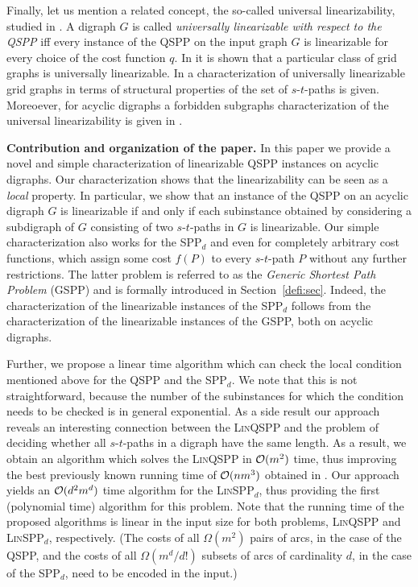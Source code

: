    Finally, let us mention a related  concept, the  so-called universal linearizability,
   studied in \cite{cela2021linearizable,huSo2018}.
A digraph $G$ is called \emph{universally linearizable with respect to the
  QSPP} iff every instance of the QSPP on the input graph $G$ is linearizable for
every choice of the cost function $q$. In \cite{huSo2018} it is shown that a
particular class of grid graphs is universally linearizable. In
\cite{cela2021linearizable} a characterization of universally linearizable grid
graphs in terms of structural properties of the set of $s$-$t$-paths is
given. Moreoever, for acyclic digraphs a forbidden subgraphs characterization of
the universal linearizability is given in \cite{cela2021linearizable}.  
\medskip

\textbf{Contribution and organization of the paper.}
In this paper we provide a novel and simple characterization of linearizable QSPP instances on acyclic 
digraphs.
Our characterization shows that the linearizability can be seen as a  \emph{local} property.  In particular, we show  that an instance of the QSPP on an acyclic 
digraph $G$  is linearizable if and only if each subinstance obtained by considering a subdigraph of $G$ consisting of two $s$-$t$-paths in $G$   is linearizable. Our simple characterization also works for the SPP$_d$  and even for completely arbitrary cost  functions, which  assign some cost $f(P)$ to every $s$-$t$-path $P$ without any further restrictions. The latter problem is referred to as the \emph{Generic Shortest Path Problem} (GSPP) and is formally introduced in Section~\ref{defi:sec}. Indeed, the characterization of the linearizable instances of the SPP$_d$ 
follows from the characterization of the linearizable instances of the GSPP, both on acyclic digraphs.

Further,  we propose  a 
linear time algorithm
which can check the local condition mentioned above   for the QSPP and the SPP$_d$. 
We note that this is not straightforward, because the number of the subinstances for which the condition needs to be checked is in general exponential. As a side result our approach reveals  an interesting connection between the \textsc{Lin}QSPP and the problem of deciding  whether all $s$-$t$-paths in a digraph have the same length.
As a result, we obtain an algorithm which solves the \textsc{Lin}QSPP  in $\mathcal{O}(m^2)$ time, thus improving the best previously known running time of $\mathcal{O}(nm^3)$ obtained in \cite{huSo2021}. Our approach yields an $\mathcal{O}(d^2 m^d)$ time algorithm for the \textsc{Lin}SPP$_d$, thus providing  the first (polynomial time) algorithm for this problem.  Note that the running time of the proposed algorithms is linear in the input size for both problems,  \textsc{Lin}QSPP and \textsc{Lin}SPP$_d$, respectively. 
(The costs of all $\Omega(m^2)$ pairs of arcs, in the case of the QSPP, and the  costs of all $\Omega(m^d/d!)$ subsets of  arcs of cardinality $d$, in the case of the
SPP$_d$,  need to be encoded in the input.) 


